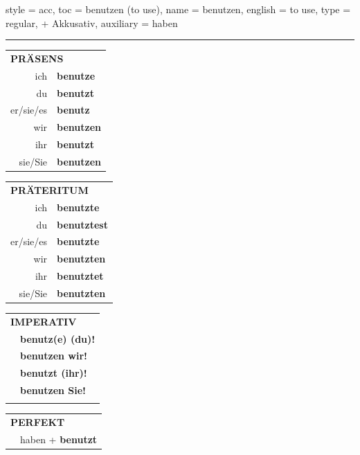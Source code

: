 \begin{verbentry}{
  style = {acc},
  toc = {benutzen (to use)},
  name = {benutzen},
  english = {to use},
  type = {regular, + Akkusativ},
  auxiliary = {haben}
}
 
    
     \vspace{5pt}

    \hrule
    
    \vspace{5pt}

  \begin{tabular}{rl}
     \multicolumn{2}{l}{\textbf{PRÄSENS} }\\
    ich & \textbf{benutze}\\
    du & \textbf{benutzt}\\
    er/sie/es & \textbf{benutz}\\
    wir & \textbf{benutzen}\\
    ihr & \textbf{benutzt}\\
    sie/Sie & \textbf{benutzen}\\
  \end{tabular}
  \hfill
     \begin{tabular}{rl}
    \multicolumn{2}{l}{\textbf{PRÄTERITUM} }\\
    ich & \textbf{benutzte}\\
    du & \textbf{benutztest}\\
    er/sie/es & \textbf{benutzte}\\
    wir & \textbf{benutzten}\\
    ihr & \textbf{benutztet}\\
    sie/Sie & \textbf{benutzten}\\
  \end{tabular}
  \hfill
  \begin{tabular}{rl}
     \multicolumn{2}{l}{\textbf{IMPERATIV} }\\
   & \textbf{benutz(e) (du)!}\\
   & \textbf{benutzen wir!}\\
   & \textbf{benutzt (ihr)!}\\
   & \textbf{benutzen Sie!}\\
   & \vspace{10pt}
  \end{tabular}

    \vspace{10pt}

 \begin{tabular}{rl}
     \multicolumn{2}{l}{\textbf{PERFEKT}}\\
   & haben + \textbf{benutzt}\\
  \end{tabular}
\hfill
   \begin{tabular}{rl}
   

\end{tabular}
\end{verbentry}
